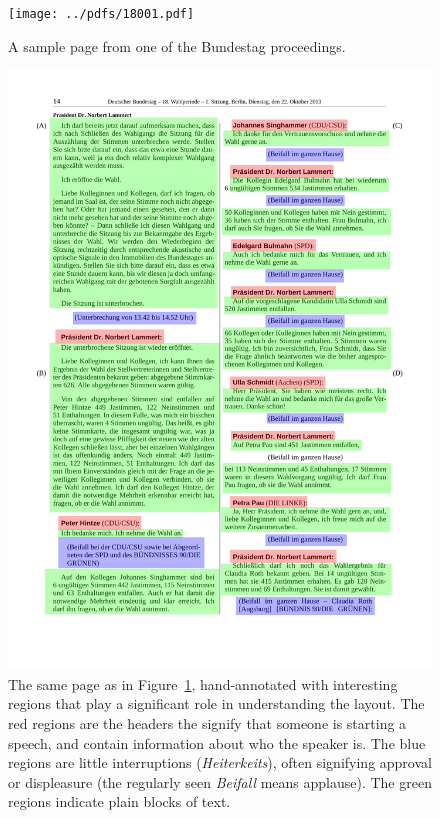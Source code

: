 \begin{figure}[p]
  \centering
  \texttt{[image: ../pdfs/18001.pdf]}
  \caption{A sample page from one of the Bundestag
    proceedings.\label{fig:pdf_page}}
\end{figure}
\begin{figure}[p]
  \centering
  \includegraphics[height=0.85\textheight]{figures/pdf_roi.pdf}
  \caption{The same page as in Figure~\ref{fig:pdf_page}, hand-annotated with
    interesting regions that play a significant role in understanding the
    layout. The red regions are the headers the signify that someone is starting
    a speech, and contain information about who the speaker is. The blue
    regions are little interruptions (\emph{Heiterkeits}), often signifying
    approval or displeasure (the regularly seen \emph{Beifall} means applause).
  The green regions indicate plain blocks of text.\label{fig:pdf_roi}}
\end{figure}

